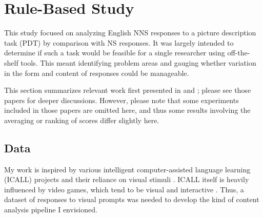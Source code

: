 
\section{Rule-Based Study}
\label{sec:pilot-study}
This study focused on analyzing English NNS responses to a picture description task (PDT) by comparison with NS responses. It was largely intended to determine if such a task would be feasible for a single researcher using off-the-shelf tools. This meant identifying problem areas and gauging whether variation in the form and content of responses could be manageable.

This section summarizes relevant work first presented in \citet{king:dickinson:13} and \citet{king:dickinson:14}; please see those papers for deeper discussions. However, please note that some experiments included in those papers are omitted here, and thus some results involving the averaging or ranking of scores differ slightly here.

\subsection{Data}
\label{sec:pilot-data}
My work is inspired by various intelligent computer-assisted language learning (ICALL) projects and their reliance on visual stimuli \citep{nagata:02, granstrom2004, yamazaki2014}. ICALL itself is heavily influenced by video games, which tend to be visual and interactive \citep{collentine2011}. Thus, a dataset of responses to visual prompts was needed to develop the kind of content analysis pipeline I envisioned.

